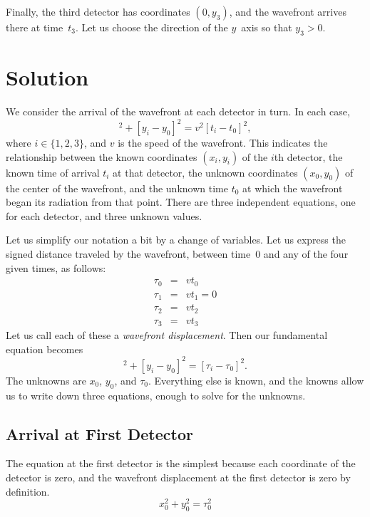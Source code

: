 \documentclass[twocolumn]{article}
\begin{document}
Finally, the third detector has coordinates $(0, y_3)$, and the wavefront
arrives there at time~$t_3$.  Let us choose the direction of the $y$~axis so
that $y_3 > 0$.

\section{Solution}

We consider the arrival of the wavefront at each detector in turn.  In each
case,
\begin{equation}
   [x_i - x_0]^2 + [y_i - y_0]^2 = v^2 [t_i - t_0]^2,
\end{equation}
where $i \in \{1, 2, 3\}$, and $v$ is the speed of the wavefront.  This
indicates the relationship between the known coordinates $(x_i, y_i)$ of the
$i$th detector, the known time of arrival $t_i$ at that detector, the unknown
coordinates $(x_0, y_0)$ of the center of the wavefront, and the unknown time
$t_0$ at which the wavefront began its radiation from that point.  There are
three independent equations, one for each detector, and three unknown values.

Let us simplify our notation a bit by a change of variables.  Let us express
the signed distance traveled by the wavefront, between time~0 and any of the
four given times, as follows:
\begin{eqnarray}
   \tau_0 &=& vt_0\\
   \tau_1 &=& vt_1 = 0\\
   \tau_2 &=& vt_2\\
   \tau_3 &=& vt_3
\end{eqnarray}
Let us call each of these a \emph{wavefront displacement}.  Then our
fundamental equation becomes
\begin{equation}
   [x_i - x_0]^2 + [y_i - y_0]^2 = [\tau_i - \tau_0]^2.
\end{equation}
The unknowns are $x_0$, $y_0$, and $\tau_0$. Everything else is known, and the
knowns allow us to write down three equations, enough to solve for the
unknowns.

\subsection{Arrival at First Detector}

The equation at the first detector is the simplest because each coordinate of
the detector is zero, and the wavefront displacement at the first detector is
zero by definition.
\begin{equation}
   x_0^2 + y_0^2 = \tau_0^2
   \label{eq:first}
\end{equation}
\end{document}
